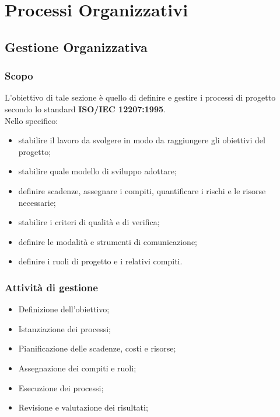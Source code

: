 \section{Processi Organizzativi}
    \subsection{Gestione Organizzativa}
        \subsubsection{Scopo}
            L'obiettivo di tale sezione è quello di definire e gestire i processi di progetto secondo lo standard \textbf{ISO/IEC 12207:1995}. \\
            Nello specifico:
            \begin{itemize}
                \item stabilire il lavoro da svolgere in modo da raggiungere gli obiettivi del progetto;
                \item stabilire quale modello di sviluppo adottare;
                \item definire scadenze, assegnare i compiti, quantificare i rischi e le risorse necessarie;
                \item stabilire i criteri di qualità e di verifica;
                \item definire le modalità e strumenti di comunicazione;
                \item definire i ruoli di progetto e i relativi compiti.
            \end{itemize}

        \subsubsection{Attività di gestione}
            \begin{itemize}
                \item Definizione dell'obiettivo;
                \item Istanziazione dei processi;
                \item Pianificazione delle scadenze, costi e risorse;
                \item Assegnazione dei compiti e ruoli;
                \item Esecuzione dei processi;
                \item Revisione e valutazione dei risultati;
            \end{itemize}

